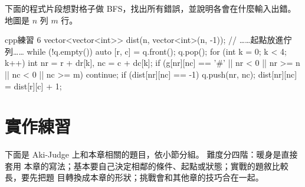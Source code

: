 \begin{drills}[label=drills:ch12]
\item 下面的程式片段想對格子做 BFS，找出所有錯誤，並說明各會在什麼輸入出錯。
地圖是 $n$ 列 $m$ 行。
\begin{code}{cpp}{練習 6}
vector<vector<int>> dist(n, vector<int>(n, -1));
// ……起點放進佇列……
while (!q.empty()) {
    auto [r, c] = q.front();
    q.pop();
    for (int k = 0; k < 4; k++) {
        int nr = r + dr[k], nc = c + dc[k];
        if (g[nr][nc] == '#' || nr < 0 || nr >= n || nc < 0 || nc >= m) {
            continue;
        }
        if (dist[nr][nc] == -1) {
            q.push({nr, nc});
        }
        dist[nr][nc] = dist[r][c] + 1;
    }
}
\end{code}
\end{drills}

\section{實作練習}
\label{sec:ch12-practice}

下面是 Aki-Judge 上和本章相關的題目，依小節分組。 難度分四階：暖身是直接套用
本章的寫法；基本要自己決定相鄰的條件、起點或狀態；實戰的題敘比較長，要先把題
目轉換成本章的形狀；挑戰會和其他章的技巧合在一起。

